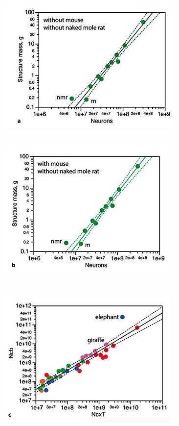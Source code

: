 \documentclass[landscape,final,paperwidth=48in,paperheight=48in,fontscale=0.285]{baposter}
\begin{document}
\begin{poster}
{\noindent \includegraphics[scale=0.61]{img/HHPlot1.png}
\\
\\
\\
\includegraphics[scale=0.61]{img/HHPlot2.png}
\\
\\
\\
\includegraphics[scale=0.61]{img/HHPlot3.png}
}

\end{poster}
\end{document}

